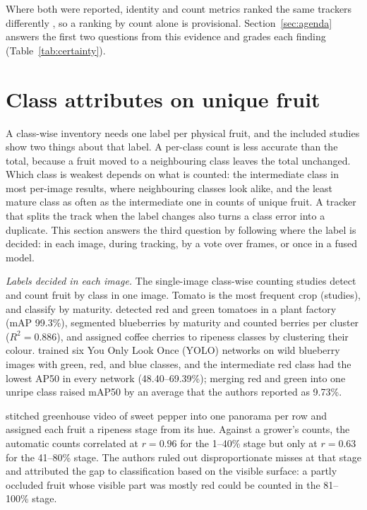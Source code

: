 Where both were reported, identity and count metrics ranked the same trackers differently \citep{qi2025assessment,ishizuka2024eggplant}, so a ranking by count alone is provisional. Section~\ref{sec:agenda} answers the first two questions from this evidence and grades each finding (Table~\ref{tab:certainty}).

\section{Class attributes on unique fruit}\label{sec:class}

A class-wise inventory needs one label per physical fruit, and the included studies show two things about that label. A per-class count is less accurate than the total, because a fruit moved to a neighbouring class leaves the total unchanged. Which class is weakest depends on what is counted: the intermediate class in most per-image results, where neighbouring classes look alike, and the least mature class as often as the intermediate one in counts of unique fruit. A tracker that splits the track when the label changes also turns a class error into a duplicate. This section answers the third question by following where the label is decided: in each image, during tracking, by a vote over frames, or once in a fused model.

\textit{Labels decided in each image.} The \nClassSingle single-image class-wise counting studies detect and count fruit by class in one image. Tomato is the most frequent crop (\nClassSingleTomato studies), and \nClassSingleMaturity classify by maturity. \citet{wang2022online} detected red and green tomatoes in a plant factory (mAP 99.3\%), \citet{ni2020deep} segmented blueberries by maturity and counted berries per cluster ($R^2=0.886$), and \citet{eron2024computer} assigned coffee cherries to ripeness classes by clustering their colour. \citet{maceachern2023detection} trained six You Only Look Once (YOLO) networks on wild blueberry images with green, red, and blue classes, and the intermediate red class had the lowest AP50 in every network (48.40--69.39\%); merging red and green into one unripe class raised mAP50 by an average that the authors reported as 9.73\%.

\citet{shimomoto2025predicting} stitched greenhouse video of sweet pepper into one panorama per row and assigned each fruit a ripeness stage from its hue. Against a grower's counts, the automatic counts correlated at $r=0.96$ for the 1--40\% stage but only at $r=0.63$ for the 41--80\% stage. The authors ruled out disproportionate misses at that stage and attributed the gap to classification based on the visible surface: a partly occluded fruit whose visible part was mostly red could be counted in the 81--100\% stage.

